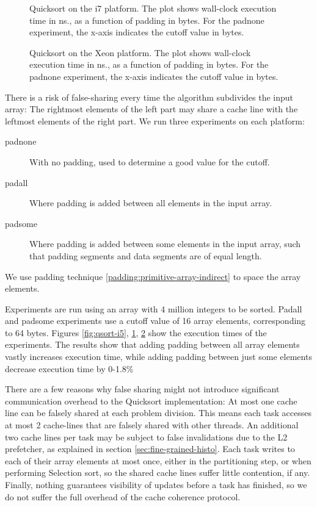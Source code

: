 \begin{figure}[hbpt]
\graphicspath{{plots/}}

	\caption{Quicksort on the i7 platform. The plot shows wall-clock execution time in
	ns., as a function of padding in bytes. For the padnone experiment, the
	x-axis indicates the cutoff value in bytes.}
	\label{fig:qsort-i7}
\end{figure}

\begin{figure}[hbpt]
\graphicspath{{plots/}}

	\caption{Quicksort on the Xeon platform. The plot shows wall-clock execution time in
	ns., as a function of padding in bytes. For the padnone experiment, the
	x-axis indicates the cutoff value in bytes.}
	\label{fig:qsort-xeon}
\end{figure}

There is a risk of false-sharing every time the algorithm subdivides the input
array: The rightmost elements of the left part may share a cache line with the
leftmost elements of the right part. We run three experiments on each platform:
\begin{description}
	\item[padnone] With no padding, used to determine a good value for the cutoff.
	\item[padall] Where padding is added between all elements in the input
		array.
	\item[padsome] Where padding is added between some elements in the input
		array, such that padding segments and data segments are of equal
		length.
\end{description}
We use padding technique
\ref{padding:primitive-array-indirect} to space the array elements.

Experiments are run using an array with 4 million integers to be sorted. Padall
and padsome experiments use a cutoff value of 16 array elements, corresponding
to 64 bytes. Figures \ref{fig:qsort-i5}, \ref{fig:qsort-i7},
\ref{fig:qsort-xeon} show the execution times of the experiments. The results
show that adding padding between all array elements vastly increases execution
time, while adding padding between just some elements decrease execution time by
0-1.8\%

There are a few reasons why false sharing might not introduce significant
communication overhead to the Quicksort implementation: At most one cache line 
can be falsely shared at each problem division. This means each task
accesses at most 2 cache-lines that are falsely shared with other threads. An
additional two cache lines per task may be subject
to false invalidations due to the L2 prefetcher, as explained in
section \ref{sec:fine-grained-histo}. Each task writes to each of their array
elements at most once, either in the partitioning step, or when performing
Selection sort, so the shared cache lines suffer little contention, if any.
Finally, nothing guarantees visibility of updates before a task has finished, so
we do not suffer the full overhead of the cache coherence protocol.

